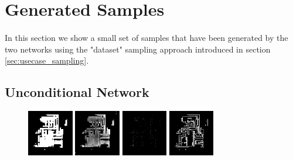 \section{Generated Samples}
\label{sec:samples}
\paragraph{} In this section we show a small set of samples that have been generated by the two networks using the "dataset" sampling approach introduced in section \ref{sec:usecase_sampling}.
\subsection{Unconditional Network}
\begin{figure}[h!] 
\begin{minipage}[b]{\linewidth}
	\begin{center}
		\includegraphics[width=2cm]{figures/results/samples/uncond/sample13_map_floormap_generated.png}
		\includegraphics[width=2cm]{figures/results/samples/uncond/sample13_map_heightmap_generated.png}
		\includegraphics[width=2cm]{figures/results/samples/uncond/sample13_map_thingsmap_generated.png}
		\includegraphics[width=2cm]{figures/results/samples/uncond/sample13_map_wallmap_generated.png}
	\end{center}
	

\end{minipage}
\end{figure}
